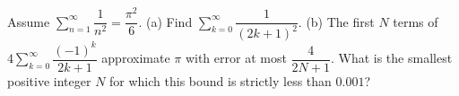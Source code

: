 Assume $\sum_{n=1}^{\infty}\dfrac{1}{n^2}=\dfrac{\pi^2}{6}$. (a) Find $\sum_{k=0}^{\infty}\dfrac{1}{(2k+1)^2}$. (b) The first $N$ terms of $4\sum_{k=0}^{\infty}\dfrac{(-1)^k}{2k+1}$ approximate $\pi$ with error at most $\dfrac{4}{2N+1}$. What is the smallest positive integer $N$ for which this bound is strictly less than $0.001$?
